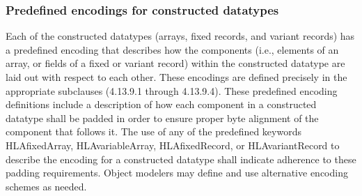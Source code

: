 \begingroup
\fontsize{7.8}{9.05}\selectfont
\setlength{\tabcolsep}{1.55pt}
\renewcommand{\arraystretch}{1.45}
\noindent{}
\endgroup

\subsubsection{Predefined encodings for constructed datatypes}
Each of the constructed datatypes (arrays, fixed records, and variant records) has a predefined encoding that describes how the components (i.e., elements of an array, or fields of a fixed or variant record) within the constructed datatype are laid out with respect to each other. These encodings are defined precisely in the appropriate subclauses (4.13.9.1 through 4.13.9.4). These predefined encoding definitions include a description of how each component in a constructed datatype shall be padded in order to ensure proper byte alignment of the component that follows it. The use of any of the predefined keywords HLAfixedArray, HLAvariableArray, HLAfixedRecord, or HLAvariantRecord to describe the encoding for a constructed datatype shall indicate adherence to these padding requirements. Object modelers may define and use alternative encoding schemes as needed.

